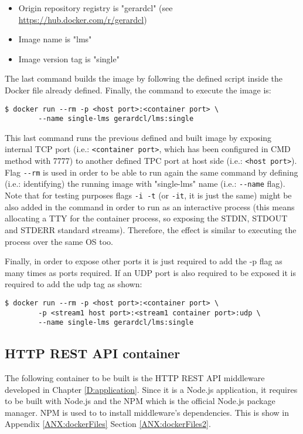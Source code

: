 \begin{itemize}
\item Origin repository registry is "gerardcl" (see \url{https://hub.docker.com/r/gerardcl})
\item Image name is "lms"
\item Image version tag is "single"
\end{itemize}

The last command builds the image by following the defined script inside the Docker file already defined. Finally, the command to execute the image is:

\begin{verbatim}
$ docker run --rm -p <host port>:<container port> \
		--name single-lms gerardcl/lms:single
\end{verbatim}

This last command runs the previous defined and built image by exposing internal TCP port (i.e.: \verb|<container port>|, which has been configured in CMD method with 7777) to another defined TPC port at host side (i.e.: \verb|<host port>|). Flag \verb|--rm| is used in order to be able to run again the same command by defining (i.e.: identifying) the running image with "single-lms" name (i.e.: \verb|--name| flag). Note that for testing purposes flags \verb|-i -t| (or \verb|-it|, it is just the same) might be also added in the command in order to run as an interactive process (this means allocating a TTY for the container process, so exposing the STDIN, STDOUT and STDERR standard streams). Therefore, the effect is similar to executing the process over the same OS too.

Finally, in order to expose other ports it is just required to add the -p flag as many times as ports required. If an UDP port is also required to be exposed it is required to add the udp tag as shown:

\begin{verbatim}
$ docker run --rm -p <host port>:<container port> \
		-p <stream1 host port>:<stream1 container port>:udp \
		--name single-lms gerardcl/lms:single
\end{verbatim}


\subsection{HTTP REST API container}

The following container to be built is the HTTP REST API middleware developed in Chapter \ref{D:application}. Since it is a Node.js application, it requires to be built with Node.js and the NPM which is the official Node.js package manager. NPM is used to to install middleware's dependencies. This is show in Appendix \ref{ANX:dockerFiles} Section \ref{ANX:dockerFiles2}.


